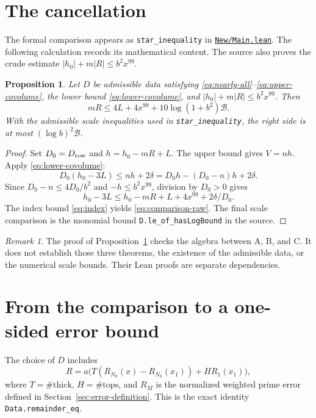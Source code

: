 \documentclass[11pt,oneside,openany]{amsbook}
\newtheorem{proposition}[theorem]{Proposition}
\theoremstyle{remark}
\newtheorem{remark}[theorem]{Remark}
\numberwithin{equation}{section}
\newcommand{\ghroot}{https://github.com/lsernau/grh-lean/blob/}
\newcommand{\ghrev}{72fead102f663d5c7a407964a13dc0cf9d977207}
\newcommand{\leanfile}[2]{%
  \href{\ghroot\ghrev/grh-compact/src/#1}{\nolinkurl{#2}}}
\begin{document}
\section{The cancellation}
\label{sec:cancellation}
The formal comparison appears as \texttt{star\_inequality} in
\leanfile{New/Main.lean}{New/Main.lean}. The following calculation
records its mathematical content. The source also proves the
crude estimate $|h_0|+m|R|\le b^2x^{99}$.

\begin{proposition}
\label{prop:comparison}
Let $D$ be admissible data satisfying
\eqref{eq:nearly-all}--\eqref{eq:upper-covolume}, the lower bound
\eqref{eq:lower-covolume}, and
$|h_0|+m|R|\le b^2x^{99}$. Then
\begin{equation}
\label{eq:comparison-raw}
mR\le4L+4x^{99}
      +10\log(1+b^2)\mathcal B.
\end{equation}
With the admissible scale inequalities used in
\texttt{star\_inequality}, the right side is at most
$(\log b)^2\mathcal B$.
\end{proposition}
\begin{proof}
Set $D_0=D_{\rm row}$ and $h=h_0-mR+L$.
The upper bound gives $V=nh$. Apply \eqref{eq:lower-covolume}:
\[
D_0(h_0-3L)\le nh+2\delta
 =D_0h-(D_0-n)h+2\delta.
\]
Since $D_0-n\le4D_0/b^2$ and $-h\le b^2x^{99}$, division by
$D_0>0$ gives
\[
h_0-3L\le h_0-mR+L+4x^{99}+2\delta/D_0.
\]
The index bound \eqref{eq:index} yields
\eqref{eq:comparison-raw}. The final scale comparison is
the monomial bound \texttt{D.le\_of\_hasLogBound} in the source.
\end{proof}

\begin{remark}
\label{rem:comparison-status}
The proof of Proposition~\ref{prop:comparison} checks the algebra
between A, B, and C. It does not establish those three theorems,
the existence of the admissible data, or the numerical scale bounds.
Their Lean proofs are separate dependencies.
\end{remark}

\section{From the comparison to a one-sided error bound}
\label{sec:one-sided}
The choice of $D$ includes
\begin{equation}
\label{eq:remainder-identity}
R=a\bigl(T(R_{N_0}(x)-R_{N_0}(x_1))
               +H R_1(x_1)\bigr),
\end{equation}
where $T=\#\mathrm{thick}$, $H=\#\mathrm{tops}$, and
$R_M$ is the normalized weighted prime error defined in
Section~\ref{sec:error-definition}. This is the exact identity
\texttt{Data.remainder\_eq}.
\end{document}
